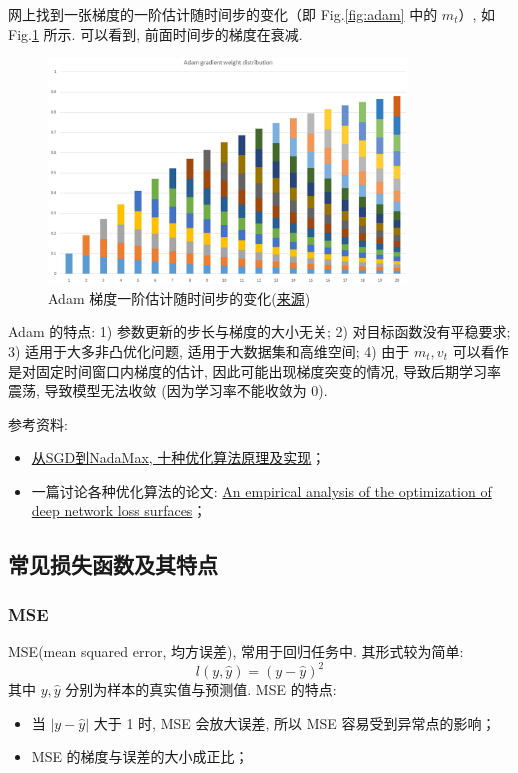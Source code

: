 网上找到一张梯度的一阶估计随时间步的变化（即 Fig.\ref{fig:adam} 中的 $m_t$）, 如 Fig.\ref{fig:adam-gradient} 所示. 可以看到, 前面时间步的梯度在衰减. 
\begin{figure}[h]
	\centering
	\includegraphics[width=0.85\textwidth]{pics/adam-gradient-weight-distribution.png}
	\caption{Adam 梯度一阶估计随时间步的变化(\href{https://www.jianshu.com/p/aebcaf8af76e}{来源})}
	\label{fig:adam-gradient}
\end{figure}

Adam 的特点: 1) 参数更新的步长与梯度的大小无关; 2) 对目标函数没有平稳要求; 3) 适用于大多非凸优化问题, 适用于大数据集和高维空间; 4) 由于 $m_t, v_t$ 可以看作是对固定时间窗口内梯度的估计, 因此可能出现梯度突变的情况, 导致后期学习率震荡, 导致模型无法收敛 (因为学习率不能收敛为 0). 

参考资料: 
\begin{itemize}
	\item \href{https://mp.weixin.qq.com/s/L9jCK5rtyq3fJZEBpLvagg}{从SGD到NadaMax, 十种优化算法原理及实现}；
	
	\item 一篇讨论各种优化算法的论文:  \href{https://arxiv.org/pdf/1612.04010.pdf}{An empirical analysis of the optimization of deep network loss surfaces}；
\end{itemize}

\subsection{常见损失函数及其特点}
\subsubsection{MSE}
MSE(mean squared error, 均方误差), 常用于回归任务中. 其形式较为简单: 
$$
l(y, \hat{y}) = (y - \hat{y})^2
$$
其中 $y, \hat{y}$ 分别为样本的真实值与预测值. MSE 的特点: 
\begin{itemize}
	\item 当 $|y - \hat{y}|$ 大于 1 时, MSE 会放大误差, 所以 MSE 容易受到异常点的影响；
	
	\item MSE 的梯度与误差的大小成正比；
\end{itemize}

